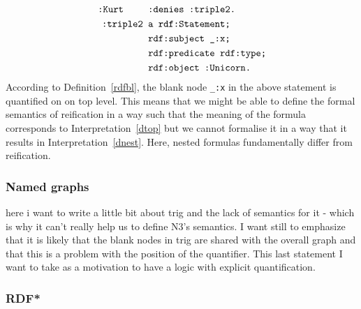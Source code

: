 \begin{equation}
 \begin{split}
 \texttt{:Kurt }\hspace{0.7cm} & \texttt{:denies :triple2.}\\
  \texttt{ :triple2 } & \texttt{a rdf:Statement;}\\
&\texttt{rdf:subject \_:x;}\\
&\texttt{rdf:predicate rdf:type;}\\
&\texttt{rdf:object :Unicorn.}
 \end{split}
\end{equation}
According to Definition~\ref{rdfbl}, the blank node \texttt{\_:x} in the above statement is quantified on on top level. This means that we might be able to define the formal semantics of \rdf reification in a way 
such that the meaning of the formula 
corresponds to Interpretation~\ref{dtop} but we cannot formalise it in a way that it results in Interpretation~\ref{dnest}. Here, nested \nthree formulas fundamentally differ from \rdf reification.


% 

\subsubsection{Named graphs}
here i want to write a little bit about trig and the lack of semantics for it - which is why it can't really help us to define N3's semantics. I want still to emphasize that 
it is likely that 
the blank nodes in trig are shared with the overall graph and that this is a problem with the position of the quantifier. This last statement I want to take as a motivation to have a 
logic with explicit quantification.

\subsubsection{RDF*}
